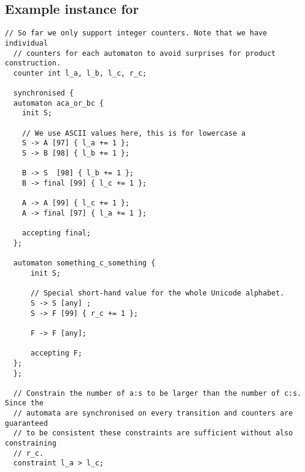 \documentclass[acmsmall,review,anonymous,screen]{acmart}\settopmatter{printfolios=true,printccs=true,printacmref=true}
\theoremstyle{definition}
\begin{document}
\subsection{Example instance for \Catra{}}
\begin{lstlisting}[caption={An example input file for \Catra{} for the problem introduced in \cref{sec:motivation}, illustrating every major syntax element. From beginning to end: synchronised (product) automata using the keyword \texttt{synchronised} (automata A and B), labels (except those with ranges), register increments, and constraints on the final values of their counters.}, label=lst:input-example]
  // So far we only support integer counters. Note that we have individual
  // counters for each automaton to avoid surprises for product construction.
  counter int l_a, l_b, l_c, r_c;

  synchronised {
  automaton aca_or_bc {
    init S;
  
    // We use ASCII values here, this is for lowercase a
    S -> A [97] { l_a += 1 };
    S -> B [98] { l_b += 1 };
  
    B -> S  [98] { l_b += 1 };
    B -> final [99] { l_c += 1 };
  
    A -> A [99] { l_c += 1 };
    A -> final [97] { l_a += 1 };
  
    accepting final;
  };
  
  automaton something_c_something {
      init S;
  
      // Special short-hand value for the whole Unicode alphabet.
      S -> S [any] ;
      S -> F [99] { r_c += 1 };
  
      F -> F [any];
  
      accepting F;
  };
  };
  
  // Constrain the number of a:s to be larger than the number of c:s. Since the
  // automata are synchronised on every transition and counters are guaranteed
  // to be consistent these constraints are sufficient without also constraining
  // r_c.
  constraint l_a > l_c;
\end{lstlisting}

\end{document}
